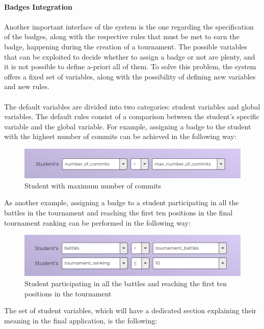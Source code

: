 \clearpage
\textbf{ }\\
\textbf{Badges Integration}\\
\\
Another important interface of the system is the one regarding the specification of the badges, along with the respective rules that must be met to earn the badge, happening during the creation of a tournament. The possible variables that can be exploited to decide whether to assign a badge or not are plenty, and it is not possible to define a-priori all of them. To solve this problem, the system offers a fixed set of variables, along with the possibility of defining new variables and new rules.\\
\\
The default variables are divided into two categories: student variables and global variables. The default rules consist of a comparison between the student's specific variable and the global variable. For example, assigning a badge to the student with the highest number of commits can be achieved in the following way:
\begin{figure}[H]
    \centering
    \includegraphics[width=0.9\linewidth]{Images/UI_Badge_form1.png}
    \caption{Student with maximum number of commits}
    \label{fig:UI_form1}
\end{figure}
As another example, assigning a badge to a student participating in all the battles in the tournament and reaching the first ten positions in the final tournament ranking can be performed in the following way:
\begin{figure}[H]
    \centering
    \includegraphics[width=0.9\linewidth]{Images/UI_Badge_form2.png}
    \caption{Student participating in all the battles and reaching the first ten positions in the tournament}
    \label{fig:UI_form2}
\end{figure}
The set of student variables, which will have a dedicated section explaining their meaning in the final application, is the following:

